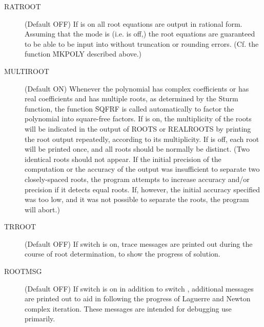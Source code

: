 \begin{description}
\item[RATROOT] (Default OFF) If  is on all root equations are
output in rational form.  Assuming that the mode is  (i.e.
 is off,) the root equations are
guaranteed to be able to be input into \REDUCE{} without truncation or
rounding errors. (Cf. the function \f{MKPOLY} described above.)

\item[MULTIROOT] (Default ON) Whenever the polynomial has complex
coefficients or has real coefficients and has multiple roots, as
 determined by the Sturm function, the function \f{SQFRF}
is called automatically to factor the polynomial into square-free factors.
If  is on, the multiplicity of the roots will be indicated
in the output of ROOTS or REALROOTS by printing the root output
repeatedly, according to its multiplicity.  If  is off,
each root will be printed once, and all roots should be normally be
distinct. (Two identical roots should not appear.  If the initial
precision of the computation or the accuracy of the output was
insufficient to separate two closely-spaced roots, the program attempts to
increase accuracy and/or precision if it detects equal roots.  If,
however, the initial accuracy specified was too low, and it was not
possible to separate the roots, the program will abort.)

\item[TRROOT] (Default OFF) If switch  is on, trace messages
are printed out during the course of root determination, to show the
progress of solution.

\item[ROOTMSG] (Default OFF) If switch
 is on in addition to switch , additional
messages are printed out to aid in following the progress of Laguerre and
Newton complex iteration.  These messages are intended for debugging use
primarily.


\end{description}


